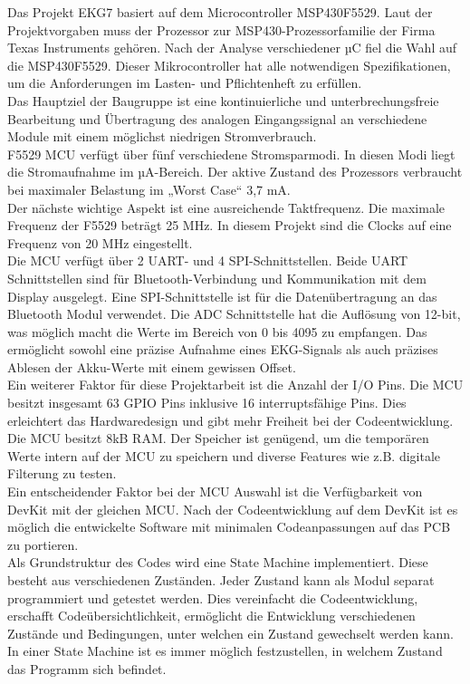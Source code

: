 Das Projekt EKG7 basiert auf dem Microcontroller MSP430F5529. Laut der Projektvorgaben muss der Prozessor zur MSP430-Prozessorfamilie der Firma Texas Instruments gehören. Nach der Analyse verschiedener µC fiel die Wahl auf die MSP430F5529. Dieser Mikrocontroller hat alle notwendigen Spezifikationen, um die Anforderungen im Lasten- und Pflichtenheft zu erfüllen.\\
Das Hauptziel der Baugruppe ist eine kontinuierliche und unterbrechungsfreie Bearbeitung und Übertragung des analogen Eingangssignal an verschiedene Module mit einem möglichst niedrigen Stromverbrauch.\\
F5529 MCU verfügt über fünf verschiedene Stromsparmodi. In diesen Modi liegt die Stromaufnahme im µA-Bereich. Der aktive Zustand des Prozessors verbraucht bei maximaler Belastung im „Worst Case“ 3,7 mA.\\
Der nächste wichtige Aspekt ist eine ausreichende Taktfrequenz. Die maximale Frequenz der F5529 beträgt 25 MHz. In diesem Projekt sind die Clocks auf eine Frequenz von 20 MHz eingestellt.\\
Die MCU verfügt über 2 UART- und 4 SPI-Schnittstellen. Beide UART Schnittstellen sind für Bluetooth-Verbindung und Kommunikation mit dem Display ausgelegt. Eine SPI-Schnittstelle ist für die Datenübertragung an das Bluetooth Modul verwendet.
Die ADC Schnittstelle hat die Auflösung von 12-bit, was möglich macht die Werte im Bereich von 0 bis 4095 zu empfangen. Das ermöglicht sowohl eine präzise Aufnahme eines EKG-Signals als auch präzises Ablesen der Akku-Werte mit einem gewissen Offset.\\ 
Ein weiterer Faktor für diese Projektarbeit ist die Anzahl der I/O Pins. Die MCU besitzt insgesamt 63 GPIO Pins inklusive 16 interruptsfähige Pins. Dies erleichtert das Hardwaredesign und gibt mehr Freiheit bei der Codeentwicklung.\\
Die MCU besitzt 8kB RAM. Der Speicher ist genügend, um die temporären Werte intern auf der MCU zu speichern und diverse Features wie z.B. digitale Filterung zu testen.\\
Ein entscheidender Faktor bei der MCU Auswahl ist die Verfügbarkeit von DevKit mit der gleichen MCU. Nach der Codeentwicklung auf dem DevKit ist es möglich die entwickelte Software mit minimalen Codeanpassungen auf das PCB zu portieren.\\

Als Grundstruktur des Codes wird eine State Machine implementiert. Diese besteht aus verschiedenen Zuständen. Jeder Zustand kann als Modul separat programmiert und getestet werden. Dies vereinfacht die Codeentwicklung, erschafft Codeübersichtlichkeit, ermöglicht die Entwicklung verschiedenen Zustände und Bedingungen, unter welchen ein Zustand gewechselt werden kann. In einer State Machine ist es immer möglich festzustellen, in welchem Zustand das Programm sich befindet.\\

